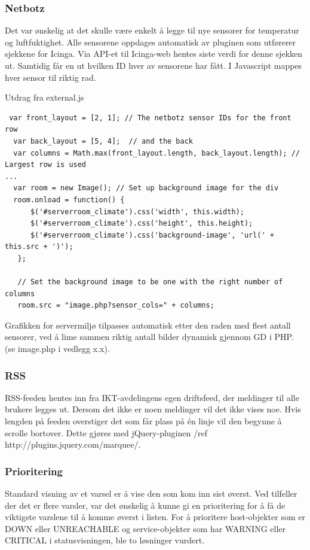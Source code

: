\subsubsection{Netbotz}

Det var ønskelig at det skulle være enkelt å legge til nye sensorer for temperatur og luftfuktighet. Alle sensorene oppdages automatisk av pluginen som utførerer sjekkene for Icinga. Via API-et til Icinga-web hentes siste verdi for denne sjekken ut. Samtidig får en ut hvilken ID hver av sensorene har fått. I Javascript mappes hver sensor til riktig rad.

Utdrag fra external.js
\begin{lstlisting}
 var front_layout = [2, 1]; // The netbotz sensor IDs for the front row
  var back_layout = [5, 4];  // and the back
  var columns = Math.max(front_layout.length, back_layout.length); // Largest row is used 
...
  var room = new Image(); // Set up background image for the div
  room.onload = function() {
      $('#serverroom_climate').css('width', this.width);
      $('#serverroom_climate').css('height', this.height);
      $('#serverroom_climate').css('background-image', 'url(' + this.src + ')');
   };

   // Set the background image to be one with the right number of columns
   room.src = "image.php?sensor_cols=" + columns;
\end{lstlisting}

Grafikken for servermiljø tilpasses automatisk etter den raden med flest antall sensorer, ved å lime sammen riktig antall bilder dynamisk gjennom GD i PHP. (se image.php i vedlegg x.x).

\subsubsection{RSS}

RSS-feeden hentes inn fra IKT-avdelingens egen driftsfeed, der meldinger til alle brukere legges ut. Dersom det ikke er noen meldinger vil det ikke vises noe. Hvis lengden på feeden overstiger det som får plass på én linje vil den begynne å scrolle bortover. Dette gjøres med jQuery-pluginen /ref http://plugins.jquery.com/marquee/.

\subsubsection{Prioritering}

Standard visning av et varsel er å vise den som kom inn sist øverst. Ved tilfeller der det er flere varsler, var det ønskelig å kunne gi en prioritering for å få de viktigste varslene til å komme øverst i listen. For å prioritere host-objekter som er DOWN eller UNREACHABLE og service-objekter som har WARNING eller CRITICAL i statusvisningen, ble to løsninger vurdert. 

